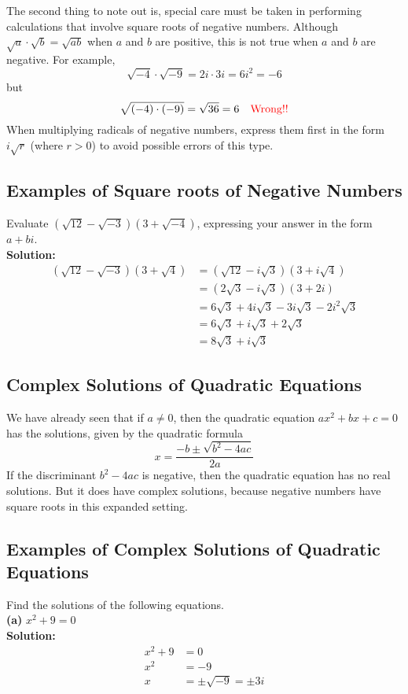 The second thing to note out is, special care must be taken in performing calculations that involve square roots of negative numbers. Although $\sqrt{a}\cdot\sqrt{b}=\sqrt{ab}$ when $a$ and $b$ are positive, this is not true when $a$ and $b$ are negative. For example, $$\sqrt{-4}\cdot\sqrt{-9}=2i\cdot3i=6i^2=-6$$ but $$\sqrt{(-4)\cdot(-9)}=\sqrt{36}=6 \quad \color{red}\text{Wrong!!} $$
When multiplying radicals of negative numbers, express them first in the form \\ $i\sqrt{r}$ (where $r>0$) to avoid possible errors of this type.

\subsection{Examples of Square roots of Negative Numbers}
Evaluate $(\sqrt{12}-\sqrt{-3})(3+\sqrt{-4})$, expressing your answer in the form $a+bi$. \\
\newline
\textbf{Solution:} \\
\begin{align*}
    (\sqrt{12}-\sqrt{-3})(3+\sqrt{4}) & =(\sqrt{12}-i\sqrt{3})(3+i\sqrt{4})           \\
                                      & =(2\sqrt{3}-i\sqrt{3})(3+2i)                  \\
                                      & =6\sqrt{3}+4i\sqrt{3}-3i\sqrt{3}-2i^2\sqrt{3} \\
                                      & =6\sqrt{3}+i\sqrt{3}+2\sqrt{3}                \\
                                      & =8\sqrt{3}+i\sqrt{3}
\end{align*}

\subsection{Complex Solutions of Quadratic Equations}
We have already seen that if $a\neq0$, then the quadratic equation $ax^2+bx+c=0$ has the solutions, given by the quadratic formula $$x=\frac{-b\pm\sqrt{b^2-4ac}}{2a}$$
If the discriminant $b^2-4ac$ is negative, then the quadratic equation has no real solutions. But it does have complex solutions, because negative numbers have square roots in this expanded setting.

\subsection{Examples of Complex Solutions of Quadratic Equations}
Find the solutions of the following equations. \\
\newline
\textbf{(a)} $x^2+9=0$ \\
\textbf{Solution:} \\
\begin{align*}
    x^2+9 & =0                  \\
    x^2   & =-9                 \\
    x     & =\pm\sqrt{-9}=\pm3i
\end{align*}


